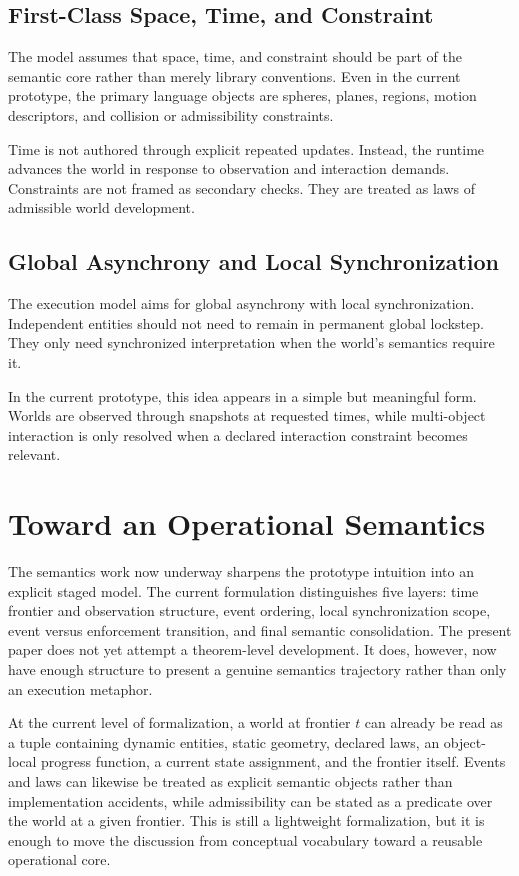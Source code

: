 \subsection{First-Class Space, Time, and Constraint}

The model assumes that space, time, and constraint should be part of the semantic core rather than merely library conventions.
Even in the current prototype, the primary language objects are spheres, planes, regions, motion descriptors, and collision or admissibility constraints.

Time is not authored through explicit repeated updates.
Instead, the runtime advances the world in response to observation and interaction demands.
Constraints are not framed as secondary checks.
They are treated as laws of admissible world development.

\subsection{Global Asynchrony and Local Synchronization}

The execution model aims for global asynchrony with local synchronization.
Independent entities should not need to remain in permanent global lockstep.
They only need synchronized interpretation when the world's semantics require it.

In the current prototype, this idea appears in a simple but meaningful form.
Worlds are observed through snapshots at requested times, while multi-object interaction is only resolved when a declared interaction constraint becomes relevant.

\section{Toward an Operational Semantics}

The semantics work now underway sharpens the prototype intuition into an explicit staged model.
The current formulation distinguishes five layers:
time frontier and observation structure, event ordering, local synchronization scope, event versus enforcement transition, and final semantic consolidation.
The present paper does not yet attempt a theorem-level development.
It does, however, now have enough structure to present a genuine semantics trajectory rather than only an execution metaphor.

At the current level of formalization, a world at frontier $t$ can already be read as a tuple containing dynamic entities, static geometry, declared laws, an object-local progress function, a current state assignment, and the frontier itself.
Events and laws can likewise be treated as explicit semantic objects rather than implementation accidents, while admissibility can be stated as a predicate over the world at a given frontier.
This is still a lightweight formalization, but it is enough to move the discussion from conceptual vocabulary toward a reusable operational core.

